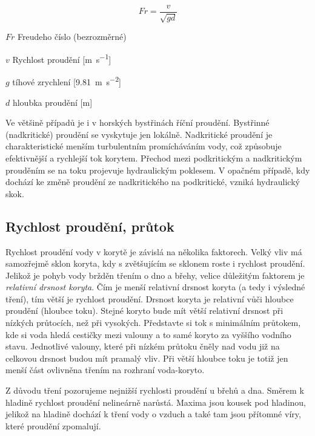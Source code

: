 \begin{equation}
	Fr=\frac{v}{\sqrt{gd}}
\end{equation}

\begin{eqexpl}
	\item{$Fr$} Freudeho číslo (bezrozměrné)
	\item{$v$} Rychlost proudění [\si{\metre\per\second}]
	\item{$g$} tíhové zrychlení [\SI{9,81}{\metre\per\second\squared}]
	\item{$d$} hloubka proudění [\si{\metre}]
\end{eqexpl}

Ve většině případů je i v horských bystřinách říční proudění. Bystřinné (nadkritické) proudění se vyskytuje jen lokálně. Nadkritické proudění je charakteristické menším turbulentním promícháváním vody, což způsobuje efektivnější a rychlejší tok korytem. Přechod mezi podkritickým a nadkritickým prouděním se na toku projevuje hydraulickým poklesem. V opačném případě, kdy dochází ke změně proudění ze nadkritického na podkritické, vzniká hydraulický skok. 

\subsection{Rychlost proudění, průtok}
Rychlost proudění vody v korytě je závislá na několika faktorech. Velký vliv má samozřejmě sklon koryta, kdy s zvětšujícím se sklonem roste i rychlost proudění. Jelikož je pohyb vody bržděn třením o dno a břehy, velice důležitým faktorem je \emph{relativní drsnost koryta}. Čím je menší relativní drsnost koryta (a tedy i výsledné tření), tím větší je rychlost proudění. Drsnost koryta je relativní vůči hloubce proudění (hloubce toku). Stejné koryto bude mít větší relativní drsnost při nízkých průtocích, než při vysokých. Představte si tok s minimálním průtokem, kde si voda hledá cestičky mezi valouny a to samé koryto za vyššího vodního stavu. Jednotlivé valouny, které při nízkém průtoku čněly nad vodu již na celkovou drsnost budou mít pramalý vliv. Při větší hloubce toku je totiž jen menší část ovlivněna třením na rozhraní voda-koryto. 

Z důvodu tření pozorujeme nejnižší rychlosti proudění u břehů a dna. Směrem k hladině rychlost proudění nelineárně narůstá. Maxima jsou kousek pod hladinou, jelikož na hladině dochází k tření vody o vzduch a také tam jsou přítomné víry, které proudění zpomalují.

